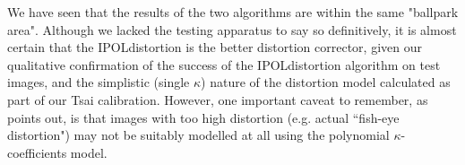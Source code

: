 We have seen that the results of the two algorithms are within the same "ballpark area". Although we lacked the testing apparatus to say so definitively, it is almost certain that the IPOLdistortion is the better distortion corrector, given our qualitative confirmation of the success of the IPOLdistortion algorithm on test images, and the simplistic (single $\kappa$) nature of the distortion model calculated as part of our Tsai calibration. However, one important caveat to remember, as \cite{straightlines} points out, is that images with too high distortion (e.g. actual ``fish-eye distortion") may not be suitably modelled at all using the polynomial $\kappa$-coefficients model.
